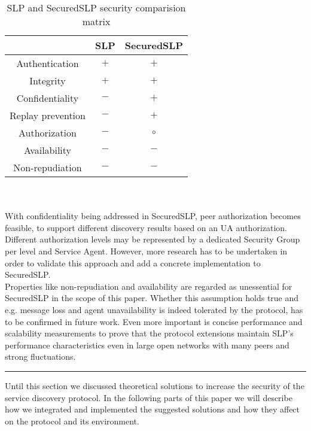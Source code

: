 \begin{table}[!h]
\begin{centering}
\begin{tabular}{|c|c|c|}
\hline 
 & SLP & SecuredSLP
\tabularnewline
\hline
\hline 
Authentication & $+$ & $+$
\tabularnewline
\hline 
Integrity & $+$ & $+$
\tabularnewline
\hline 
Confidentiality & $-$ & $+$
\tabularnewline
\hline 
Replay prevention & $-$ & $+$
\tabularnewline
\hline 
Authorization & $-$ & $\circ$
\tabularnewline
\hline 
Availability & $-$ & $-$
\tabularnewline
\hline 
Non-repudiation & $-$ & $-$
\tabularnewline
\hline
\end{tabular}
\par\end{centering}

\caption{\label{tab:SLP-and-SecuredSLP}SLP and SecuredSLP security comparision matrix}
\end{table}\\\\
With confidentiality being addressed in SecuredSLP, peer authorization becomes feasible, to support different discovery results based on an UA authorization. Different authorization levels may be represented by a dedicated Security Group per level and Service Agent. However, more research has to be undertaken in order to validate this approach and add a concrete implementation to SecuredSLP.\\
Properties like non-repudiation and availability are regarded as unessential for SecuredSLP in the scope of this paper. Whether this assumption holds true and e.g. message loss and agent unavailability is indeed tolerated by the protocol, has to be confirmed in future work. Even more important is concise performance and scalability measurements to prove that the protocol extensions maintain SLP's performance characteristics even in large open networks with many peers and strong fluctuations.\\
\hrule
Until this section we discussed theoretical solutions to increase the security of the service discovery protocol. In the following parts of this paper we will describe how we integrated and implemented the suggested solutions and how they affect on the protocol and its environment.